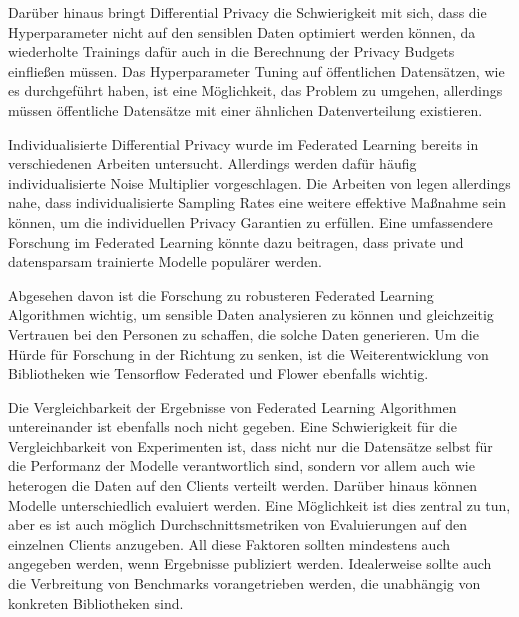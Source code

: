 Darüber hinaus bringt Differential Privacy die Schwierigkeit mit sich, dass die Hyperparameter nicht auf den sensiblen Daten optimiert werden können, da wiederholte Trainings dafür auch in die Berechnung der Privacy Budgets einfließen müssen. Das Hyperparameter Tuning auf öffentlichen Datensätzen, wie es \textcite{ramaswamy:2020} durchgeführt haben, ist eine Möglichkeit, das Problem zu umgehen, allerdings müssen öffentliche Datensätze mit einer ähnlichen Datenverteilung existieren.

Individualisierte Differential Privacy wurde im Federated Learning bereits in verschiedenen Arbeiten untersucht. Allerdings werden dafür häufig individualisierte Noise Multiplier vorgeschlagen. Die Arbeiten von \textcite{jorgensen:2015, boenisch:2023} legen allerdings nahe, dass individualisierte Sampling Rates eine weitere effektive Maßnahme sein können, um die individuellen Privacy Garantien zu erfüllen. Eine umfassendere Forschung im Federated Learning könnte dazu beitragen, dass private und datensparsam trainierte Modelle populärer werden.

Abgesehen davon ist die Forschung zu robusteren Federated Learning Algorithmen wichtig, um sensible Daten analysieren zu können und gleichzeitig Vertrauen bei den Personen zu schaffen, die solche Daten generieren. Um die Hürde für Forschung in der Richtung zu senken, ist die Weiterentwicklung von Bibliotheken wie Tensorflow Federated und Flower \cite{beutel:2020} ebenfalls wichtig. 

Die Vergleichbarkeit der Ergebnisse von Federated Learning Algorithmen untereinander ist ebenfalls noch nicht gegeben. Eine Schwierigkeit für die Vergleichbarkeit von Experimenten ist, dass nicht nur die Datensätze selbst für die Performanz der Modelle verantwortlich sind, sondern vor allem auch wie heterogen die Daten auf den Clients verteilt werden. Darüber hinaus können Modelle unterschiedlich evaluiert werden. Eine Möglichkeit ist dies zentral zu tun, aber es ist auch möglich Durchschnittsmetriken von Evaluierungen auf den einzelnen Clients anzugeben. All diese Faktoren sollten mindestens auch angegeben werden, wenn Ergebnisse publiziert werden. Idealerweise sollte auch die Verbreitung von Benchmarks vorangetrieben werden, die unabhängig von konkreten Bibliotheken sind.